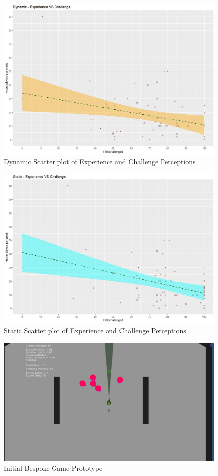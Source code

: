\documentclass[journal]{IEEEtran}
\begin{document}
\begin{figure}[h]
	\includegraphics[width=0.75\linewidth]{dynamicexpvschallenge.jpg}
	\caption{Dynamic Scatter plot of Experience and Challenge Perceptions}
	\label{fig::17}
\end{figure}

\begin{figure}[h]
	\includegraphics[width=0.75\linewidth]{staticexpvschallenge.jpg}
	\caption{Static Scatter plot of Experience and Challenge Perceptions}
	\label{fig::18}
\end{figure}

\begin{figure}[h]
	\includegraphics[width=0.75\linewidth]{secondprototype.jpg}
	\caption{Initial Bespoke Game Prototype}
	\label{fig::19}
\end{figure} 
\end{document}
